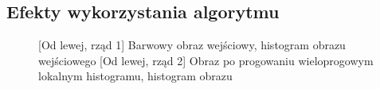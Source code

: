 \documentclass[a4paper,12pt, titlepage]{report}
\begin{document}
\subsection*{Efekty wykorzystania algorytmu}
\begin{figure}[h]
    \centering
    \qquad
    \caption{[Od lewej, rząd 1] Barwowy obraz wejściowy, histogram obrazu wejściowego [Od lewej, rząd 2] Obraz po progowaniu wieloprogowym lokalnym histogramu, histogram obrazu}%
    \label{fig:rysunek}%
\end{figure}
\end{document}
